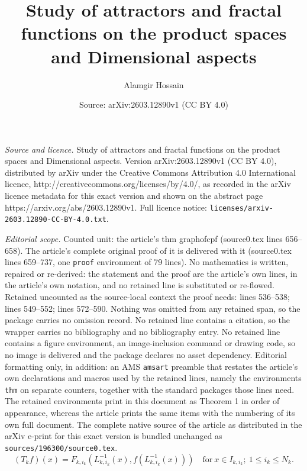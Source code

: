 \documentclass[10pt,a4paper]{amsart}
\title{Study of attractors and fractal functions on the product spaces and Dimensional aspects}
\author{Alamgir Hossain}
\date{Source: arXiv:2603.12890v1 (CC BY 4.0)}
\newcommand{\myseries}[3]{#1\leq #2\leq #3}
\begin{document}
\maketitle

\noindent\emph{Source and licence.} Study of attractors and fractal functions on the product spaces and Dimensional aspects. Version arXiv:2603.12890v1 (CC BY 4.0), distributed by arXiv under the Creative Commons Attribution 4.0 International licence, http://creativecommons.org/licenses/by/4.0/, as recorded in the arXiv licence metadata for this exact version and shown on the abstract page https://arxiv.org/abs/2603.12890v1. Full licence notice: \texttt{licenses/arxiv-2603.12890-CC-BY-4.0.txt}.\par\smallskip

\noindent\textit{Editorial scope.} Counted unit: the article's thm graphofcpf (source0.tex lines 656--658). The article's complete original proof of it is delivered with it (source0.tex lines 659--737, one \texttt{proof} environment of 79 lines). No mathematics is written, repaired or re-derived: the statement and the proof are the article's own lines, in the article's own notation, and no retained line is substituted or re-flowed.  Retained uncounted as the source-local context the proof needs: lines 536--538; lines 549--552; lines 572--590.  Nothing was omitted from any retained span, so the package carries no omission record.  No retained line contains a citation, so the wrapper carries no bibliography and no bibliography entry.  No retained line contains a figure environment, an image-inclusion command or drawing code, so no image is delivered and the package declares no asset dependency.  Editorial formatting only, in addition: an AMS \texttt{amsart} preamble that restates the article's own declarations and macros used by the retained lines, namely the environments \texttt{thm} on separate counters, together with the standard packages those lines need.  The retained environments print in this document as Theorem 1 in order of appearance, whereas the article prints the same items with the numbering of its own full document.  The complete native source of the article as distributed in the arXiv e-print for this exact version is bundled unchanged as \texttt{sources/196300/source0.tex}.
	\begin{equation}
		(T_kf)(x)=F_{k,i_k}(L_{k,i_k}^{-1}(x),f(L_{k,i_k}^{-1}(x)))\quad\mbox{for}~x\in I_{k,i_k};~\myseries{1}{i_k}{N_k}. \label{prodrbop}
	\end{equation}  
\end{document}
